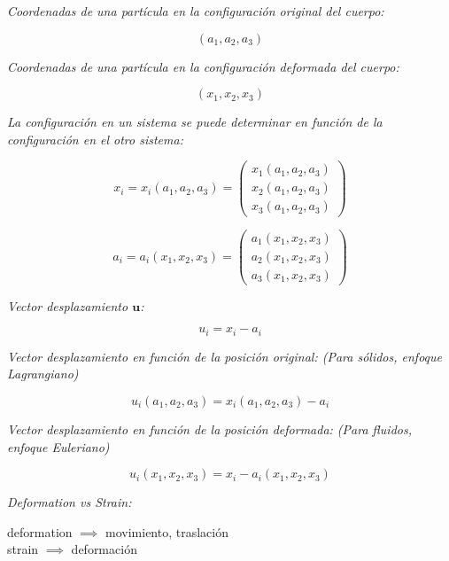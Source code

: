 \documentclass[a4paper,10pt,twoside,final,spanish]{article}
\begin{document}
\textit{Coordenadas de una partícula en la configuración original del cuerpo:}

\[
(a_{1},a_{2},a_{3})
\]

\textit{Coordenadas de una partícula en la configuración deformada del cuerpo:}

\[
(x_{1},x_{2},x_{3})
\]

\textit{La configuración en un sistema se puede determinar en función de la configuración en el otro sistema:}

\begin{equation}
x_{i}=x_{i}(a_{1},a_{2},a_{3})=
\begin{pmatrix}
x_{1}(a_{1},a_{2},a_{3}) \\
x_{2}(a_{1},a_{2},a_{3}) \\
x_{3}(a_{1},a_{2},a_{3})
\end{pmatrix}
\end{equation}

\begin{equation}
a_{i}=a_{i}(x_{1},x_{2},x_{3})=
\begin{pmatrix}
a_{1}(x_{1},x_{2},x_{3}) \\
a_{2}(x_{1},x_{2},x_{3}) \\
a_{3}(x_{1},x_{2},x_{3})
\end{pmatrix}
\end{equation}

\textit{Vector desplazamiento $\mathbf{u}$:}

\begin{equation}
u_{i}=x_{i}-a_{i}
\end{equation}

\textit{Vector desplazamiento en función de la posición original: (Para sólidos, enfoque Lagrangiano)}

\begin{equation}
u_{i}(a_{1},a_{2},a_{3})=x_{i}(a_{1},a_{2},a_{3})-a_{i}
\end{equation}

\textit{Vector desplazamiento en función de la posición deformada: (Para fluidos, enfoque Euleriano)}

\begin{equation}
u_{i}(x_{1},x_{2},x_{3})=x_{i}-a_{i}(x_{1},x_{2},x_{3})
\end{equation}

\textit{Deformation vs Strain:}

\begin{center}
deformation $\implies$ movimiento, traslación \\
strain $\implies$ deformación
\end{center}
\end{document}
